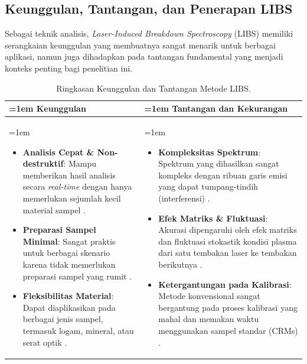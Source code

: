 \subsection{Keunggulan, Tantangan, dan Penerapan LIBS}
\label{sec:keunggulan_tantangan_libs}

Sebagai teknik analisis, \textit{Laser-Induced Breakdown Spectroscopy} (LIBS) memiliki serangkaian keunggulan yang membuatnya sangat menarik untuk berbagai aplikasi, namun juga dihadapkan pada tantangan fundamental yang menjadi konteks penting bagi penelitian ini.

\begin{table}[H]
\centering
\caption{Ringkasan Keunggulan dan Tantangan Metode LIBS.}
\label{tab:keunggulan_tantangan}
\begin{tabularx}{\textwidth}{
  >{\raggedright\arraybackslash\hangindent=1em \hangafter=1}X 
  >{\raggedright\arraybackslash\hangindent=1em \hangafter=1}X
}
\toprule
\textbf{Keunggulan} & \textbf{Tantangan dan Kekurangan} \\
\midrule
\begin{itemize}
    \item \textbf{Analisis Cepat \& Non-destruktif}: Mampu memberikan hasil analisis secara \textit{real-time} dengan hanya memerlukan sejumlah kecil material sampel \cite{cremers2013handbook}.
    \item \textbf{Preparasi Sampel Minimal}: Sangat praktis untuk berbagai skenario karena tidak memerlukan preparasi sampel yang rumit \cite{cremers2013handbook}.
    \item \textbf{Fleksibilitas Material}: Dapat diaplikasikan pada berbagai jenis sampel, termasuk logam, mineral, atau serat optik \cite{miziolek2006libs}.
\end{itemize} & 
\begin{itemize}
    \item \textbf{Kompleksitas Spektrum}: Spektrum yang dihasilkan sangat kompleks dengan ribuan garis emisi yang dapat tumpang-tindih (interferensi) \cite{cremers2013handbook}.
    \item \textbf{Efek Matriks \& Fluktuasi}: Akurasi dipengaruhi oleh efek matriks dan fluktuasi stokastik kondisi plasma dari satu tembakan laser ke tembakan berikutnya \cite{gaudiuso2023matrix}.
    \item \textbf{Ketergantungan pada Kalibrasi}: Metode konvensional sangat bergantung pada proses kalibrasi yang mahal dan memakan waktu menggunakan sampel standar (CRMs) \cite{porizka2018review}.
\end{itemize} \\
\bottomrule
\end{tabularx}
\end{table}

